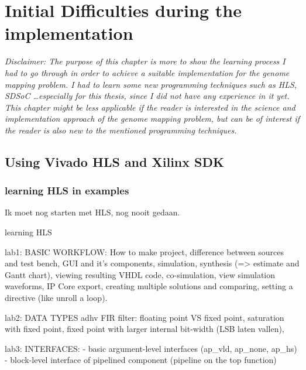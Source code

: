 
\chapter{Initial Difficulties during the implementation}

\textit{Disclaimer: The purpose of this chapter is more to show the learning process I had to go through in order to achieve a suitable implementation for the genome mapping problem. I had to learn some new programming techniques such as HLS, SDSoC \dots especially for this thesis, since I did not have any experience in it yet. This chapter might be less applicable if the reader is interested in the science and implementation approach of the genome mapping problem, but can be of interest if the reader is also new to the mentioned programming techniques.}

\section{Using Vivado HLS and Xilinx SDK}

\subsection{learning HLS in examples}

Ik moet nog starten met HLS, nog nooit gedaan.

learning HLS

lab1: BASIC WORKFLOW: How to make project, difference between sources and test bench, GUI and it's components, simulation, synthesis (=> estimate and Gantt chart), viewing resulting VHDL code, co-simulation, view simulation waveforms, IP Core export, creating multiple solutions and comparing, setting a directive (like unroll a loop).

lab2: DATA TYPES adhv FIR filter: floating point VS fixed point, saturation with fixed point, fixed point with larger internal bit-width (LSB laten vallen), 

lab3: INTERFACES:
- basic argument-level interfaces (ap\_vld, ap\_none, ap\_hs)
- block-level interface of pipelined component (pipeline on the top function)

